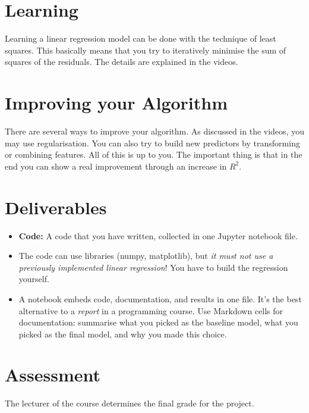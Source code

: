 \documentclass[11pt, leqno, a4paper]{article}
\begin{document}
\section{Learning}

Learning a linear regression model can be done with the technique of least squares. This basically
means that you try to iteratively minimise the sum of squares of the residuals. The details are
explained in the videos.

\section{Improving your Algorithm}

There are several ways to improve your algorithm. As discussed in the videos, you may use regularisation.
You can also try to build new predictors by transforming or combining features. All of this
is up to you. The important thing is that in the end you can show a real improvement through an
increase in $ R^{2} $.

\section{Deliverables}
\begin{itemize}
\item \textbf{Code:} A code that you have written, collected in one Jupyter notebook file. 
\item The code can use libraries (numpy, matplotlib), but \emph{it must not use a previously implemented linear regression}! You have to build the regression yourself.
\item A notebook embeds code, documentation, and results in one file. It's the best alternative to a \emph{report} in a programming course. Use Markdown cells for documentation: summarise what you picked as the baseline model, what you picked as the final model, and why you made this choice. 
\end{itemize}

\section{Assessment}
The lecturer of the course determines the final grade for the project.
\end{document}
